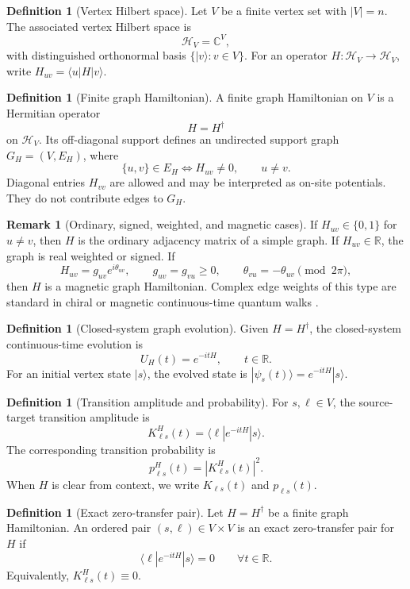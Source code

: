 \documentclass[11pt]{article}
\theoremstyle{definition}
\newtheorem{definition}[theorem]{Definition}
\newtheorem{remark}[theorem]{Remark}
\newcommand{\cH}{\mathcal H}
\newcommand{\R}{\mathbb R}
\begin{document}
\begin{definition}[Vertex Hilbert space]
Let $V$ be a finite vertex set with $|V|=n$. The associated vertex Hilbert space is
\[
\cH_V=\mathbb C^V,
\]
with distinguished orthonormal basis $\{|v\rangle:v\in V\}$. For an operator $H:\cH_V\to\cH_V$, write $H_{uv}=\langle u|H|v\rangle$.
\end{definition}

\begin{definition}[Finite graph Hamiltonian]
A finite graph Hamiltonian on $V$ is a Hermitian operator
\[
H=H^\dagger
\]
on $\cH_V$. Its off-diagonal support defines an undirected support graph $G_H=(V,E_H)$, where
\[
\{u,v\}\in E_H \Longleftrightarrow H_{uv}\ne0,\qquad u\ne v.
\]
Diagonal entries $H_{vv}$ are allowed and may be interpreted as on-site potentials. They do not contribute edges to $G_H$.
\end{definition}

\begin{remark}[Ordinary, signed, weighted, and magnetic cases]
If $H_{uv}\in\{0,1\}$ for $u\ne v$, then $H$ is the ordinary adjacency matrix of a simple graph. If $H_{uv}\in\R$, the graph is real weighted or signed. If
\[
H_{uv}=g_{uv}e^{i\theta_{uv}},\qquad g_{uv}=g_{vu}\ge0,\qquad \theta_{vu}=-\theta_{uv}\pmod{2\pi},
\]
then $H$ is a magnetic graph Hamiltonian. Complex edge weights of this type are standard in chiral or magnetic continuous-time quantum walks \citep{Zimboras2013,Lu2016,Sett2019}.
\end{remark}

\begin{definition}[Closed-system graph evolution]
Given $H=H^\dagger$, the closed-system continuous-time evolution is
\[
U_H(t)=e^{-itH},\qquad t\in\R.
\]
For an initial vertex state $|s\rangle$, the evolved state is $|\psi_s(t)\rangle=e^{-itH}|s\rangle$.
\end{definition}

\begin{definition}[Transition amplitude and probability]
For $s,\ell\in V$, the source-target transition amplitude is
\[
K^H_{\ell s}(t)=\langle \ell|e^{-itH}|s\rangle .
\]
The corresponding transition probability is
\[
p^H_{\ell s}(t)=|K^H_{\ell s}(t)|^2.
\]
When $H$ is clear from context, we write $K_{\ell s}(t)$ and $p_{\ell s}(t)$.
\end{definition}

\begin{definition}[Exact zero-transfer pair]
Let $H=H^\dagger$ be a finite graph Hamiltonian. An ordered pair $(s,\ell)\in V\times V$ is an exact zero-transfer pair for $H$ if
\[
\langle \ell|e^{-itH}|s\rangle=0\qquad \forall t\in\R .
\]
Equivalently, $K^H_{\ell s}(t)\equiv0$.
\end{definition}
\end{document}
